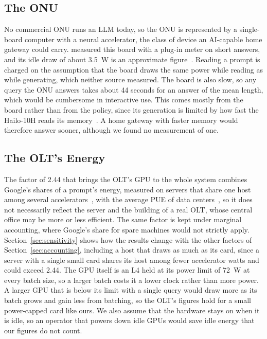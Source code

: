 \documentclass[cic,dipl,english]{infufrgs}
\begin{document}
\subsection{The ONU}

No commercial ONU runs an LLM today, so the ONU is represented by a single-board computer with
a neural accelerator, the class of device an AI-capable home gateway could carry.
 measured this board with a plug-in meter on short answers, and its
idle draw of about 3.5~W is an approximate figure~\cite{tummalapalli2026edge}. Reading a prompt
is charged on the assumption that the board draws the same power while reading as while
generating, which neither source measured. The board is also slow, so any query the ONU answers
takes about 44 seconds for an answer of the mean length, which would be cumbersome in
interactive use. This comes mostly from the board rather than from the policy, since its
generation is limited by how fast the Hailo-10H reads its memory~\cite{tummalapalli2026edge}.
A home gateway with faster memory would therefore answer sooner, although we found no
measurement of one.

\subsection{The OLT's Energy}

The factor of 2.44 that brings the OLT's GPU to the whole system combines Google's shares of
a prompt's energy, measured on servers that share one host among several
accelerators~\cite{elsworth2025measuring}, with the average PUE of data
centers~\cite{uptime2025survey}, so it does not necessarily reflect the server and the
building of a real OLT, whose central office may be more or less efficient. The same factor
is kept under marginal accounting, where Google's share for spare machines would not
strictly apply. Section~\ref{sec:sensitivity} shows how the results change with the other
factors of Section~\ref{sec:accounting}, including a host that draws as much as its card, since
a server with a single small card shares its host among fewer accelerator watts and could exceed
2.44. The GPU itself
is an L4 held at its power limit of 72~W at every batch size, so a larger batch costs it a lower clock rather than more power. A larger GPU
that is below its limit with a single query would draw more as its batch grows and gain
less from batching, so the OLT's figures hold for a small power-capped card like ours. We also
assume that the hardware stays on when it is idle, so an operator that powers down idle GPUs
would save idle energy that our figures do not count.
\end{document}

